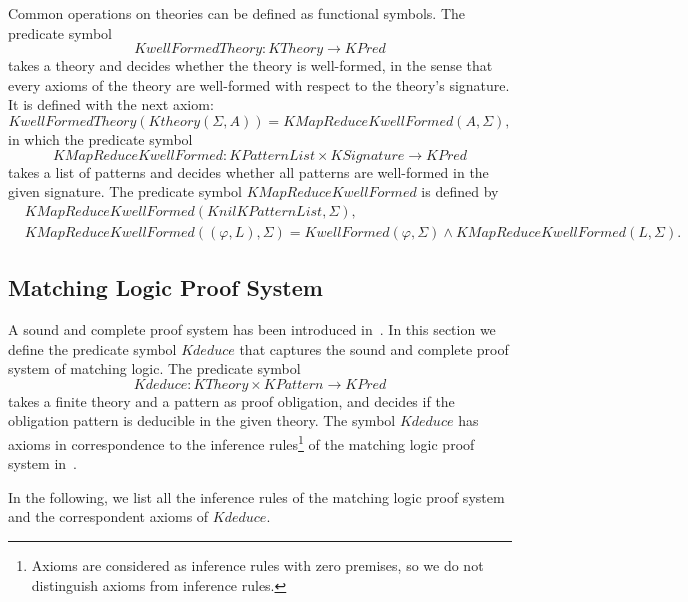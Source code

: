 \documentclass[UTF8,11pt]{article}
\theoremstyle{plain}
\theoremstyle{definition}
\theoremstyle{remark}
\newcommand{\KPred}{\mathit{KPred}}
\newcommand{\KPatternList}{\mathit{KPatternList}}
\newcommand{\KnilKPatternList}{\mathit{KnilKPatternList}}
\newcommand{\KPattern}{\mathit{KPattern}}
\newcommand{\KSignature}{\mathit{KSignature}}
\newcommand{\KwellFormed}{\mathit{KwellFormed}}
\newcommand{\KMapReduceKwellFormed}{\mathit{KMapReduceKwellFormed}}
\newcommand{\KTheory}{\mathit{KTheory}}
\newcommand{\Ktheory}{\mathit{Ktheory}}
\newcommand{\KwellFormedTheory}{\mathit{KwellFormedTheory}}
\newcommand{\Kdeduce}{\mathit{Kdeduce}}
\begin{document}
Common operations on theories can be defined as functional symbols.
The predicate symbol
\begin{equation*}
  \KwellFormedTheory \colon \KTheory \to \KPred
\end{equation*}
takes a theory and decides whether the theory is well-formed, in the sense that every axioms of the theory are well-formed with respect to the theory's signature.
It is defined with the next axiom:
\begin{equation*}
\KwellFormedTheory(\Ktheory(\Sigma, A)) = \KMapReduceKwellFormed(A, \Sigma),
\end{equation*}
in which the predicate symbol
$$ \KMapReduceKwellFormed \colon \KPatternList \times \KSignature \to \KPred$$
takes a list of patterns and decides whether all patterns are well-formed in the given signature.
The predicate symbol $\KMapReduceKwellFormed$ is defined by
\begin{align*}
 & \KMapReduceKwellFormed(\KnilKPatternList, \Sigma),\\
 & \KMapReduceKwellFormed((\varphi, L), \Sigma) = \KwellFormed(\varphi, \Sigma) \wedge \KMapReduceKwellFormed(L, \Sigma).
\end{align*}


\subsection{Matching Logic Proof System}
\label{sec:ml-proof-system-finite-case}

A sound and complete proof system has been introduced in~\cite{rosu-2017-lmcs}.
In this section we define the predicate symbol $\Kdeduce$ that captures the sound and complete proof system of matching logic.
The predicate symbol
$$
\Kdeduce \colon \KTheory \times \KPattern \to \KPred
$$
takes a finite theory and a pattern as proof obligation, and decides if the obligation pattern is deducible in the given theory.
The symbol $\Kdeduce$ has axioms in correspondence to the inference rules\footnote{Axioms are considered as inference rules with zero premises, so we do not distinguish axioms from inference rules.} 
of the matching logic proof system in~\cite{rosu-2017-lmcs}.

In the following, we list all the inference rules of the matching logic proof system and the correspondent axioms of $\Kdeduce$. 
\end{document}
